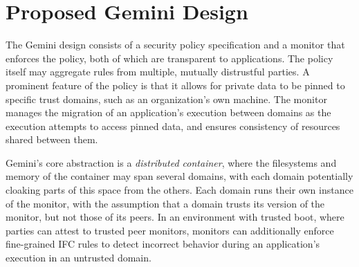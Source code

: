 \section{Proposed Gemini Design}
\label{sec:gemini-design}
%
%

The Gemini design consists of a security policy specification and a monitor
that enforces the policy, both of which are transparent to applications.
%
The policy itself may aggregate rules from multiple, mutually
distrustful parties.
%
A prominent feature of the policy is that it allows for private data to be pinned
to specific trust domains, such as an organization's own machine.
%
The monitor manages the migration of an application's execution between domains
as the execution attempts to access pinned data, and ensures consistency of
resources shared between them.


Gemini's core abstraction is a \emph{distributed container},
where the filesystems and memory of the container may span several
domains, with each domain potentially cloaking parts of this space from the
others.
%
Each domain runs their own instance of the monitor, with the assumption that a
domain trusts its version of the monitor, but not those of its peers.
%
In an environment with trusted boot, where parties can attest to trusted peer
monitors, monitors can additionally enforce fine-grained IFC rules to detect
incorrect behavior during an application's execution in an untrusted domain.

%
%
%

